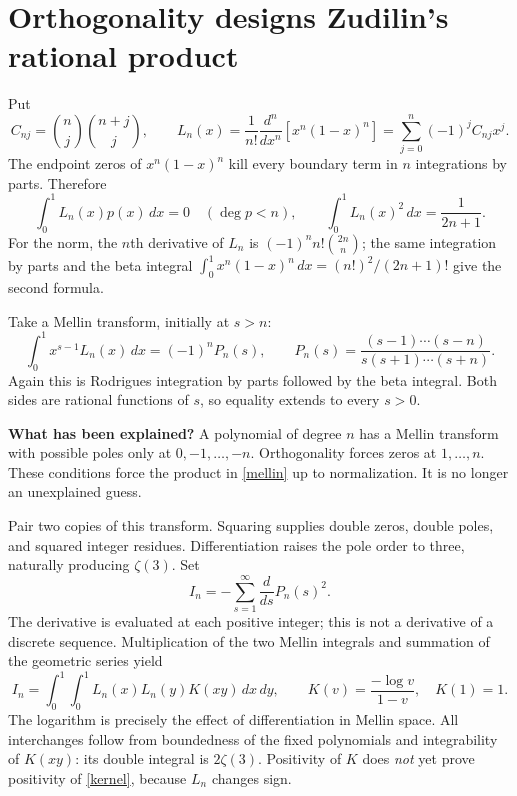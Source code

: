 \documentclass[11pt]{article}
\newcommand{\dd}{\,d}
\begin{document}
\section{Orthogonality designs Zudilin's rational product}
Put
\[
 C_{nj}=\binom nj\binom{n+j}j,\qquad
 L_n(x)=\frac1{n!}\frac{d^n}{dx^n}[x^n(1-x)^n]
       =\sum_{j=0}^n(-1)^jC_{nj}x^j.
\]
The endpoint zeros of $x^n(1-x)^n$ kill every boundary term in $n$ integrations by parts. Therefore
\begin{equation}\label{orth}
 \int_0^1 L_n(x)p(x)\dd x=0\quad(\deg p<n),\qquad
 \int_0^1L_n(x)^2\dd x=\frac1{2n+1}.
\end{equation}
For the norm, the $n$th derivative of $L_n$ is $(-1)^n n!\binom{2n}n$; the same integration by parts and the beta integral
$\int_0^1x^n(1-x)^n\dd x=(n!)^2/(2n+1)!$ give the second formula.

Take a Mellin transform, initially at $s>n$:
\begin{equation}\label{mellin}
 \int_0^1x^{s-1}L_n(x)\dd x=(-1)^nP_n(s),\qquad
 P_n(s)=\frac{(s-1)\cdots(s-n)}{s(s+1)\cdots(s+n)}.
\end{equation}
Again this is Rodrigues integration by parts followed by the beta integral. Both sides are rational functions of $s$, so equality extends to every $s>0$.

\textbf{What has been explained?} A polynomial of degree $n$ has a Mellin transform with possible poles only at $0,-1,\ldots,-n$. Orthogonality forces zeros at $1,\ldots,n$. These conditions force the product in \eqref{mellin} up to normalization. It is no longer an unexplained guess.

Pair two copies of this transform. Squaring supplies double zeros, double poles, and squared integer residues. Differentiation raises the pole order to three, naturally producing $\zeta(3)$. Set
\begin{equation}\label{series}
 I_n=-\sum_{s=1}^{\infty}\frac{d}{ds}P_n(s)^2.
\end{equation}
The derivative is evaluated at each positive integer; this is not a derivative of a discrete sequence. Multiplication of the two Mellin integrals and summation of the geometric series yield
\begin{equation}\label{kernel}
 I_n=\int_0^1\!\int_0^1L_n(x)L_n(y)K(xy)\dd x\dd y,
 \qquad K(v)=\frac{-\log v}{1-v},\quad K(1)=1.
\end{equation}
The logarithm is precisely the effect of differentiation in Mellin space. All interchanges follow from boundedness of the fixed polynomials and integrability of $K(xy)$: its double integral is $2\zeta(3)$. Positivity of $K$ does \emph{not} yet prove positivity of \eqref{kernel}, because $L_n$ changes sign.
\end{document}
